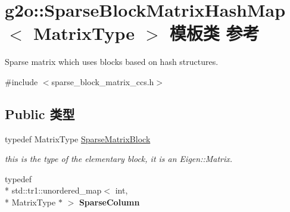 \hypertarget{classg2o_1_1SparseBlockMatrixHashMap}{\section{g2o\-:\-:Sparse\-Block\-Matrix\-Hash\-Map$<$ Matrix\-Type $>$ 模板类 参考}
\label{classg2o_1_1SparseBlockMatrixHashMap}
}


Sparse matrix which uses blocks based on hash structures.  




{\ttfamily \#include $<$sparse\-\_\-block\-\_\-matrix\-\_\-ccs.\-h$>$}

\subsection*{Public 类型}
\begin{DoxyCompactItemize}
\item 
\hypertarget{classg2o_1_1SparseBlockMatrixHashMap_a03d422844dbf0b10f4fcf7e69fdb0bca}{typedef Matrix\-Type \hyperlink{classg2o_1_1SparseBlockMatrixHashMap_a03d422844dbf0b10f4fcf7e69fdb0bca}{Sparse\-Matrix\-Block}}\label{classg2o_1_1SparseBlockMatrixHashMap_a03d422844dbf0b10f4fcf7e69fdb0bca}

\begin{DoxyCompactList}\small\item\em this is the type of the elementary block, it is an Eigen\-::\-Matrix. \end{DoxyCompactList}\item 
\hypertarget{classg2o_1_1SparseBlockMatrixHashMap_ae364a722296b90e32dd6c3a8fbeb49ae}{typedef \\*
std\-::tr1\-::unordered\-\_\-map$<$ int, \\*
Matrix\-Type $\ast$ $>$ {\bfseries Sparse\-Column}}\label{classg2o_1_1SparseBlockMatrixHashMap_ae364a722296b90e32dd6c3a8fbeb49ae}

\end{DoxyCompactItemize}
